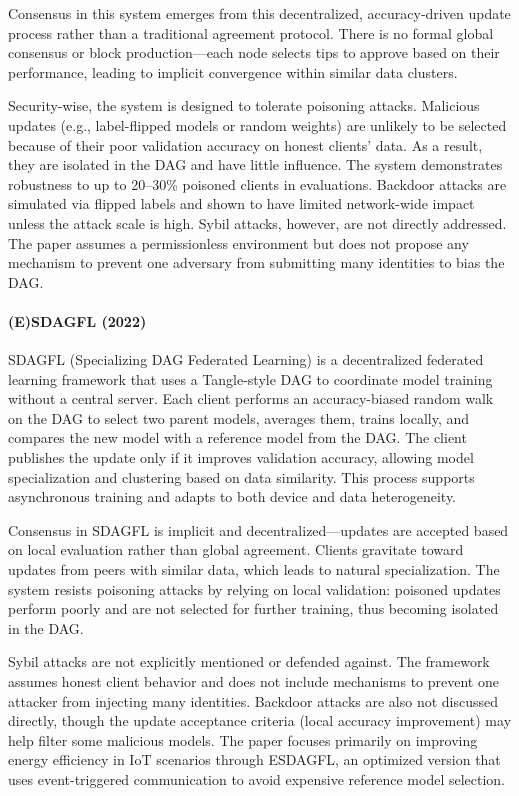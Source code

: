 Consensus in this system emerges from this decentralized, accuracy-driven update process rather than a traditional agreement protocol. There is no formal global consensus or block production—each node selects tips to approve based on their performance, leading to implicit convergence within similar data clusters.

Security-wise, the system is designed to tolerate poisoning attacks. Malicious updates (e.g., label-flipped models or random weights) are unlikely to be selected because of their poor validation accuracy on honest clients' data. As a result, they are isolated in the DAG and have little influence. The system demonstrates robustness to up to 20–30\% poisoned clients in evaluations. Backdoor attacks are simulated via flipped labels and shown to have limited network-wide impact unless the attack scale is high. Sybil attacks, however, are not directly addressed. The paper assumes a permissionless environment but does not propose any mechanism to prevent one adversary from submitting many identities to bias the DAG.

\newpage
\paragraph{(E)SDAGFL (2022)} \cite{xue_energy_2022}
SDAGFL (Specializing DAG Federated Learning) is a decentralized federated learning framework that uses a Tangle-style DAG to coordinate model training without a central server. Each client performs an accuracy-biased random walk on the DAG to select two parent models, averages them, trains locally, and compares the new model with a reference model from the DAG. The client publishes the update only if it improves validation accuracy, allowing model specialization and clustering based on data similarity. This process supports asynchronous training and adapts to both device and data heterogeneity.

Consensus in SDAGFL is implicit and decentralized—updates are accepted based on local evaluation rather than global agreement. Clients gravitate toward updates from peers with similar data, which leads to natural specialization. The system resists poisoning attacks by relying on local validation: poisoned updates perform poorly and are not selected for further training, thus becoming isolated in the DAG.

Sybil attacks are not explicitly mentioned or defended against. The framework assumes honest client behavior and does not include mechanisms to prevent one attacker from injecting many identities. Backdoor attacks are also not discussed directly, though the update acceptance criteria (local accuracy improvement) may help filter some malicious models. The paper focuses primarily on improving energy efficiency in IoT scenarios through ESDAGFL, an optimized version that uses event-triggered communication to avoid expensive reference model selection.

